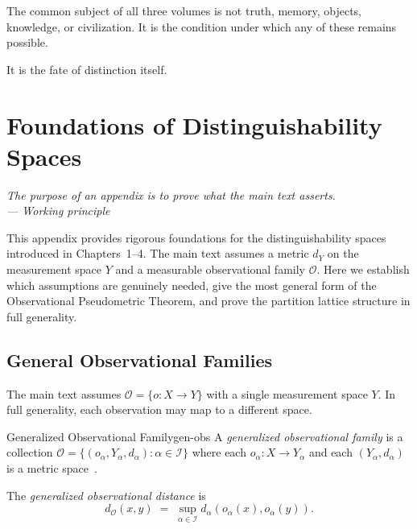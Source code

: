 \documentclass[12pt,twoside,openright]{book}
\newcommand{\obs}{\mathcal{O}}
\newcommand{\distMetric}{d_{\mathcal{O}}}
\newenvironment{epigraph}[2]{%
  \vspace{1em}\begin{flushright}
  \begin{minipage}{0.72\textwidth}
  \itshape\small #1\\[0.4em]
  \upshape\footnotesize\sffamily\color{DistGray}--- #2
  \end{minipage}\end{flushright}\vspace{1.5em}}{}
\begin{document}
The common subject of all three volumes is not truth, memory,
objects, knowledge, or civilization. It is the condition under
which any of these remains possible.

It is the fate of distinction itself.



\appendix
\renewcommand{\thechapter}{\Alph{chapter}}
\renewcommand{\theHchapter}{\Alph{chapter}}



\appendix


\chapter{Foundations of Distinguishability Spaces}
\label{app:foundations}

\begin{epigraph}{The purpose of an appendix is to prove what
  the main text asserts.}{Working principle}
\end{epigraph}

This appendix provides rigorous foundations for the
distinguishability spaces introduced in Chapters~1--4. The
main text assumes a metric $d_Y$ on the measurement space $Y$
and a measurable observational family $\obs$. Here we establish
which assumptions are genuinely needed, give the most general
form of the Observational Pseudometric Theorem, and prove the
partition lattice structure in full generality.

\section{General Observational Families}

The main text assumes $\obs=\{o:X\to Y\}$ with a single
measurement space $Y$. In full generality, each observation
may map to a different space.

\begin{definition}{Generalized Observational Family}{gen-obs}
A \emph{generalized observational family} is a collection
$\obs=\{(o_\alpha, Y_\alpha, d_\alpha):\alpha\in\mathcal{I}\}$
where each $o_\alpha:X\to Y_\alpha$ and each
$(Y_\alpha,d_\alpha)$ is a metric space~\cite{suppes2002}.

The \emph{generalized observational distance} is
\[
  \distMetric(x,y)
  \;=\;
  \sup_{\alpha\in\mathcal{I}} d_\alpha(o_\alpha(x),o_\alpha(y)).
\]
\end{definition}
\end{document}
